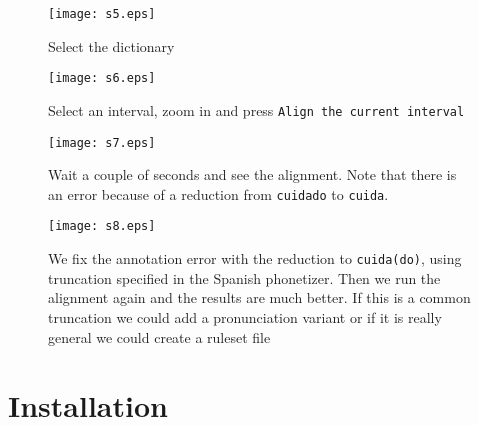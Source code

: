 \begin{figure}[H]
	\centering
	\texttt{[image: s5.eps]}
	\caption{Select the dictionary}
\end{figure}

\begin{figure}[H]
	\centering
	\texttt{[image: s6.eps]}
	\caption{Select an interval, zoom in and press
	\texttt{Align the current interval}}
\end{figure}

\begin{figure}[H]
	\centering
	\texttt{[image: s7.eps]}
	\caption{Wait a couple of seconds and see the alignment. Note that there is
an error because of a reduction from \texttt{cuidado} to \texttt{cuida}.}
\end{figure}

\begin{figure}[H]
	\centering
	\texttt{[image: s8.eps]}
	\caption{We fix the annotation error with the reduction to
\texttt{cuida(do)}, using truncation specified in the Spanish phonetizer. Then
we run the alignment again and the results are much better. If this is a common
truncation we could add a pronunciation variant or if it is really general we
could create a ruleset file}
\end{figure}

\chapter{Installation}
